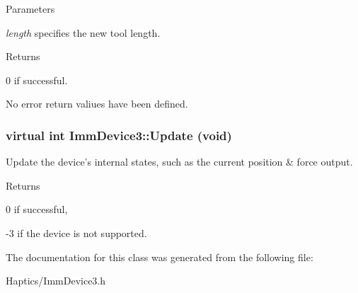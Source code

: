 \begin{DoxyParams}{Parameters}
\item[{\em length}]specifies the new tool length.\end{DoxyParams}
\begin{DoxyReturn}{Returns}

\end{DoxyReturn}
0 if successful.

No error return valiues have been defined. \hypertarget{classImmDevice3_a3f2b0eff86139112fd69ac5adcc431df}{
\subsubsection[{Update}]{\setlength{\rightskip}{0pt plus 5cm}virtual int ImmDevice3::Update (void)}}
\label{classImmDevice3_a3f2b0eff86139112fd69ac5adcc431df}
Update the device's internal states, such as the current position \& force output.

\begin{DoxyReturn}{Returns}

\end{DoxyReturn}
0 if successful,

-\/3 if the device is not supported. 

The documentation for this class was generated from the following file:\begin{DoxyCompactItemize}
\item 
Haptics/ImmDevice3.h\end{DoxyCompactItemize}
